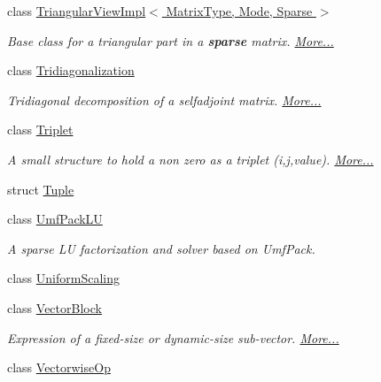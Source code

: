 \begin{DoxyCompactItemize}
class \hyperlink{group___sparse_core___module_class_eigen_1_1_triangular_view_impl_3_01_matrix_type_00_01_mode_00_01_sparse_01_4}{Triangular\+View\+Impl$<$ Matrix\+Type, Mode, Sparse $>$}
\begin{DoxyCompactList}\small\item\em Base class for a triangular part in a {\bfseries sparse} matrix.  \hyperlink{group___sparse_core___module_class_eigen_1_1_triangular_view_impl_3_01_matrix_type_00_01_mode_00_01_sparse_01_4}{More...}\end{DoxyCompactList}\item 
class \hyperlink{group___eigenvalues___module_class_eigen_1_1_tridiagonalization}{Tridiagonalization}
\begin{DoxyCompactList}\small\item\em Tridiagonal decomposition of a selfadjoint matrix.  \hyperlink{group___eigenvalues___module_class_eigen_1_1_tridiagonalization}{More...}\end{DoxyCompactList}\item 
class \hyperlink{group___sparse_core___module_class_eigen_1_1_triplet}{Triplet}
\begin{DoxyCompactList}\small\item\em A small structure to hold a non zero as a triplet (i,j,value).  \hyperlink{group___sparse_core___module_class_eigen_1_1_triplet}{More...}\end{DoxyCompactList}\item 
struct \hyperlink{struct_eigen_1_1_tuple}{Tuple}
\item 
class \hyperlink{class_eigen_1_1_umf_pack_l_u}{Umf\+Pack\+LU}
\begin{DoxyCompactList}\small\item\em A sparse LU factorization and solver based on Umf\+Pack. \end{DoxyCompactList}\item 
class \hyperlink{class_eigen_1_1_uniform_scaling}{Uniform\+Scaling}
\item 
class \hyperlink{group___core___module_class_eigen_1_1_vector_block}{Vector\+Block}
\begin{DoxyCompactList}\small\item\em Expression of a fixed-\/size or dynamic-\/size sub-\/vector.  \hyperlink{group___core___module_class_eigen_1_1_vector_block}{More...}\end{DoxyCompactList}\item 
class \hyperlink{group___core___module_class_eigen_1_1_vectorwise_op}{Vectorwise\+Op}

\end{DoxyCompactItemize}
